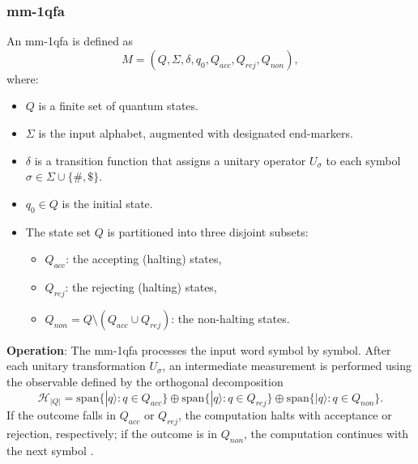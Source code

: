 \subsubsection{\acrfull{mm-1qfa}}
\label{sssec:mm-1qfa}
\begin{definition}[mm-1qfa]
An \gls{mm-1qfa} is defined as 
\[
M = (Q, \Sigma, \delta, q_0, Q_{acc}, Q_{rej}, Q_{non}),
\]
where:
\begin{itemize}
    \item \( Q \) is a finite set of quantum states.
    \item \( \Sigma \) is the input alphabet, augmented with designated end-markers.
    \item \( \delta \) is a transition function that assigns a unitary operator \( U_\sigma \) to each symbol \( \sigma \in \Sigma \cup \{\#, \$\} \).
    \item \( q_0 \in Q \) is the initial state.
    \item The state set \( Q \) is partitioned into three disjoint subsets:
    \begin{itemize}
        \item \( Q_{acc} \): the accepting (halting) states,
        \item \( Q_{rej} \): the rejecting (halting) states,
        \item \( Q_{non} = Q \setminus (Q_{acc} \cup Q_{rej}) \): the non-halting states.
    \end{itemize}
\end{itemize}
\end{definition}

\textbf{Operation}:  
The \gls{mm-1qfa} processes the input word symbol by symbol. After each unitary transformation \( U_\sigma \), an intermediate measurement is performed using the observable defined by the orthogonal decomposition 
\[
\mathcal{H}_{|Q|} = \mathrm{span}\{ |q\rangle : q \in Q_{acc} \} \oplus \mathrm{span}\{ |q\rangle : q \in Q_{rej} \} \oplus \mathrm{span}\{ |q\rangle : q \in Q_{non} \}.
\]
If the outcome falls in \( Q_{acc} \) or \( Q_{rej} \), the computation halts with acceptance or rejection, respectively; if the outcome is in \( Q_{non} \), the computation continues with the next symbol \cite{kondacs1997power,ambainis2009superiority}.


